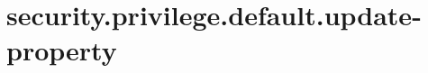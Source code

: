 \section{security.privilege.default.update-property}
\label{configuration:SecurityPrivilegeDefaultUpdateProperty}
\AvailableInJavaOnly{\TODO}